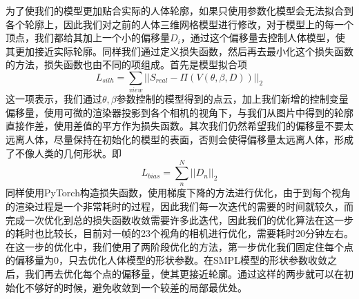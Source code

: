 为了使我们的模型更加贴合实际的人体轮廓，如果只使用参数化模型会无法拟合到各个轮廓上，因此我们对之前的人体三维网格模型进行修改，对于模型上的每一个顶点，我们都给其加上一个小的偏移量\(D_i\)，通过这个偏移量去控制人体模型，使其更加接近实际轮廓。同样我们通过定义损失函数，然后再去最小化这个损失函数的方法，损失函数也由不同的项组成。首先是模型拟合项
\begin{equation}
    L_{silh} = \sum_{view} || S_{real} - \Pi(V(\theta, \beta, D)) ||_2
\end{equation}
这一项表示，我们通过\(\theta, \beta\)参数控制的模型得到的点云，加上我们新增的控制变量偏移量，使用可微的渲染器投影到各个相机的视角下，与我们从图片中得到的轮廓直接作差，使用差值的平方作为损失函数。其次我们仍然希望我们的偏移量不要太远离人体，尽量保持在初始化的模型的表面，否则会使得偏移量太远离人体，形成了不像人类的几何形状。即
\begin{equation}
    L_{bias} = \sum_n^N || D_n ||_2
\end{equation}
同样使用PyTorch构造损失函数，使用梯度下降的方法进行优化，由于到每个视角的渲染过程是一个非常耗时的过程，因此我们每一次迭代的需要的时间就较久，而完成一次优化到总的损失函数收敛需要许多此迭代，因此我们的优化算法在这一步的耗时也比较长，目前对一帧的23个视角的相机进行优化，需要耗时20分钟左右。在这一步的优化中，我们使用了两阶段优化的方法，第一步优化我们固定住每个点的偏移量为0，只去优化人体模型的形状参数。在SMPL模型的形状参数收敛之后，我们再去优化每个点的偏移量，使其更接近轮廓。通过这样的两步就可以在初始化不够好的时候，避免收敛到一个较差的局部最优处。

